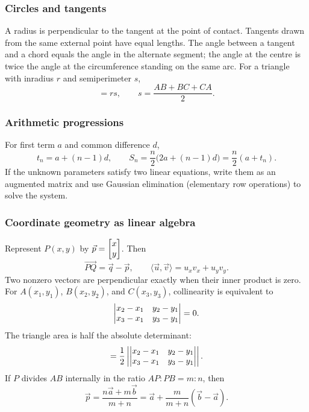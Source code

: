 \subsubsection*{Circles and tangents}
A radius is perpendicular to the tangent at the point of contact. Tangents drawn from the same external point have equal lengths. The angle between a tangent and a chord equals the angle in the alternate segment; the angle at the centre is twice the angle at the circumference standing on the same arc. For a triangle with inradius $r$ and semiperimeter $s$,
\begin{equation}
[ABC]=rs,\qquad s=\frac{AB+BC+CA}{2}.
\label{eq:triangle-inradius}
\end{equation}

\subsubsection*{Arithmetic progressions}
For first term $a$ and common difference $d$,
\begin{equation}
t_n=a+(n-1)d,\qquad
S_n=\frac n2\bigl(2a+(n-1)d\bigr)=\frac n2(a+t_n).
\label{eq:ap}
\end{equation}
If the unknown parameters satisfy two linear equations, write them as an augmented matrix and use Gaussian elimination (elementary row operations) to solve the system.

\subsubsection*{Coordinate geometry as linear algebra}
Represent $P(x,y)$ by $\vec p=\myvec{x\\y}$. Then
\begin{equation}
\overrightarrow{PQ}=\vec q-\vec p,\qquad
\langle\vec u,\vec v\rangle=u_xv_x+u_yv_y.
\label{eq:vector-basics}
\end{equation}
Two nonzero vectors are perpendicular exactly when their inner product is zero. For $A(x_1,y_1)$, $B(x_2,y_2)$, and $C(x_3,y_3)$, collinearity is equivalent to
\begin{equation}
\begin{vmatrix}x_2-x_1&y_2-y_1\\x_3-x_1&y_3-y_1\end{vmatrix}=0.
\label{eq:collinear-det}
\end{equation}
The triangle area is half the absolute determinant:
\begin{equation}
[ABC]=\frac12\left|\mydet{x_2-x_1&y_2-y_1\\x_3-x_1&y_3-y_1}\right|.
\label{eq:triangle-det}
\end{equation}
If $P$ divides $AB$ internally in the ratio $AP:PB=m:n$, then
\begin{equation}
\vec p=\frac{n\vec a+m\vec b}{m+n}=\vec a+\frac{m}{m+n}(\vec b-\vec a).
\label{eq:section-vector}
\end{equation}

